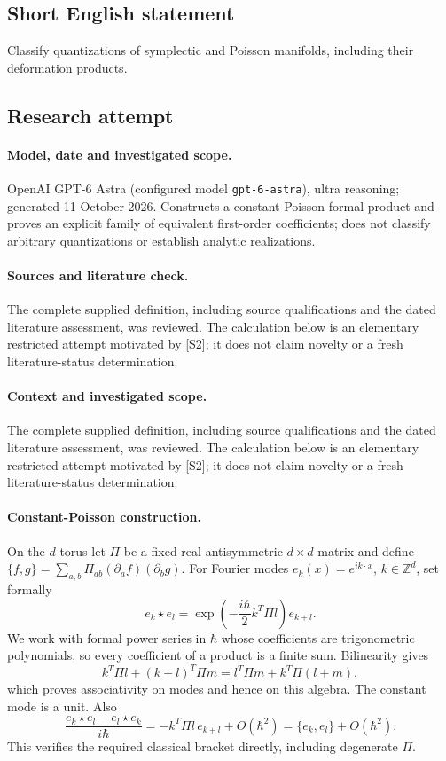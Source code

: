 \documentclass[11pt]{article}
\begin{document}
\subsection{Short English statement}
Classify quantizations of symplectic and Poisson manifolds, including their deformation products.
\subsection{Research attempt}
\paragraph{Model, date and investigated scope.}
OpenAI GPT-6 Astra (configured model \texttt{gpt-6-astra}), ultra reasoning; generated 11 October 2026. Constructs a constant-Poisson formal product and proves an explicit family of equivalent first-order coefficients; does not classify arbitrary quantizations or establish analytic realizations.

\paragraph{Sources and literature check.}
The complete supplied definition, including source qualifications and the dated literature assessment, was reviewed. The calculation below is an elementary restricted attempt motivated by [S2]; it does not claim novelty or a fresh literature-status determination.

\paragraph{Context and investigated scope.} The complete supplied definition, including source qualifications and the dated literature assessment, was reviewed. The calculation below is an elementary restricted attempt motivated by [S2]; it does not claim novelty or a fresh literature-status determination.

\paragraph{Constant-Poisson construction.}
On the $d$-torus let $\Pi$ be a fixed real antisymmetric $d\times d$ matrix and define
$\{f,g\}=\sum_{a,b}\Pi_{ab}(\partial_af)(\partial_bg)$.
For Fourier modes $e_k(x)=e^{ik\cdot x}$, $k\in\mathbb Z^d$, set formally
\[
 e_k\star e_l=\exp\left(-\frac{i\hbar}{2}k^T\Pi l\right)e_{k+l}.
\]
We work with formal power series in $\hbar$ whose coefficients are trigonometric polynomials, so every coefficient of a product is a finite sum. Bilinearity gives
\[
 k^T\Pi l+(k+l)^T\Pi m
 =l^T\Pi m+k^T\Pi(l+m),
\]
which proves associativity on modes and hence on this algebra. The constant mode is a unit. Also
\[
 \frac{e_k\star e_l-e_l\star e_k}{i\hbar}
 =-k^T\Pi l\,e_{k+l}+O(\hbar^2)
 =\{e_k,e_l\}+O(\hbar^2).
\]
This verifies the required classical bracket directly, including degenerate $\Pi$.
\end{document}
